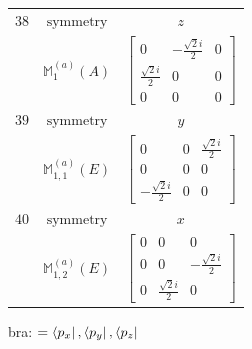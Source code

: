 \documentclass[fleqn,8pt,landscape]{jsarticle}
\begin{document}
\begin{longtable}{ccc}
$ 38 $ & $ \text{symmetry} $ & $ z $ \\
$  $ & $ \mathbb{M}_{1}^{(a)}(A) $ & $ \begin{bmatrix} 0 & - \frac{\sqrt{2} i}{2} & 0 \\ \frac{\sqrt{2} i}{2} & 0 & 0 \\ 0 & 0 & 0 \end{bmatrix} $ \\ \hline
$ 39 $ & $ \text{symmetry} $ & $ y $ \\
$  $ & $ \mathbb{M}_{1,1}^{(a)}(E) $ & $ \begin{bmatrix} 0 & 0 & \frac{\sqrt{2} i}{2} \\ 0 & 0 & 0 \\ - \frac{\sqrt{2} i}{2} & 0 & 0 \end{bmatrix} $ \\ \hline
$ 40 $ & $ \text{symmetry} $ & $ x $ \\
$  $ & $ \mathbb{M}_{1,2}^{(a)}(E) $ & $ \begin{bmatrix} 0 & 0 & 0 \\ 0 & 0 & - \frac{\sqrt{2} i}{2} \\ 0 & \frac{\sqrt{2} i}{2} & 0 \end{bmatrix} $ \\ \hline
\end{longtable}
bra: $=\bra{p_{x}}, \bra{p_{y}}, \bra{p_{z}}$
\end{document}
